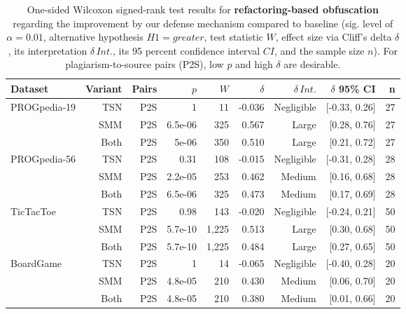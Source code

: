 \begin{table}[h]
\centering
\small
\begin{tabular}{lrrrrrrrr}
  \toprule
Dataset & Variant & Pairs & $p$ & $W$ & $\delta$ & $\delta\,Int.$ & $\delta$ 95\% CI & n \\
        \midrule
   \multirow{3}{*}{{PROGpedia-19}}& TSN & P2S & 1 & 11 & -0.036 & Negligible & [-0.33, 0.26] & 27 \\ 
   & SMM & P2S & 6.5e-06 & 325 & 0.567 & Large & [0.28, 0.76] & 27 \\ 
   & Both & P2S & 5e-06 & 350 & 0.510 & Large & [0.21, 0.72] & 27 \\
     \hline
   \multirow{3}{*}{{PROGpedia-56}}& TSN & P2S & 0.31 & 108 & -0.015 & Negligible & [-0.31, 0.28] & 28 \\ 
   & SMM & P2S & 2.2e-05 & 253 & 0.462 & Medium & [0.16, 0.68] & 28 \\ 
   & Both & P2S & 6.5e-06 & 325 & 0.473 & Medium & [0.17, 0.69] & 28 \\ 
   \hline
   \multirow{3}{*}{{TicTacToe}} & TSN & P2S & 0.98 & 143 & -0.020 & Negligible & [-0.24, 0.21] & 50 \\ 
   & SMM & P2S & 5.7e-10 & 1,225 & 0.513 & Large & [0.30, 0.68] & 50 \\ 
   & Both & P2S & 5.7e-10 & 1,225 & 0.484 & Large & [0.27, 0.65] & 50 \\ 
  \hline 
   \multirow{3}{*}{{BoardGame}}& TSN & P2S & 1 & 14 & -0.065 & Negligible & [-0.40, 0.28] & 20 \\ 
   & SMM & P2S & 4.8e-05 & 210 & 0.430 & Medium & [0.06, 0.70] & 20 \\ 
   & Both & P2S & 4.8e-05 & 210 & 0.380 & Medium & [0.01, 0.66] & 20 \\
   \bottomrule
\end{tabular}
\caption[Statistical Tests: Refactoring-based Obfuscation]{One-sided Wilcoxon signed-rank test results for \textbf{refactoring-based obfuscation} regarding the improvement by our defense mechanism compared to baseline (sig. level of $\alpha=0.01$, alternative hypothesis $H1=greater$, test statistic $W$, effect size via Cliff's delta $\delta$, its interpretation $\delta\,Int.$, its 95 percent confidence interval $CI$, and the sample size $n$). For plagiarism-to-source pairs (P2S), low $p$ and high $\delta$ are desirable.} 
\label{tab:to-base-refactor}
\end{table}